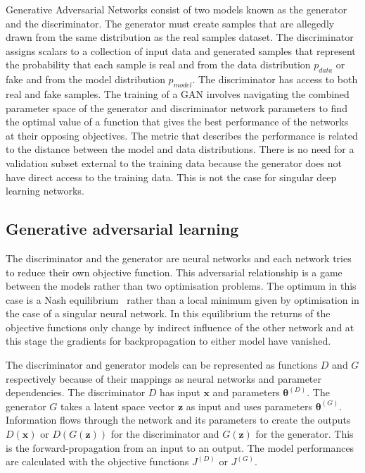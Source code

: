 \documentclass[twocolumn]{article}
\numberwithin{equation}{section}
\begin{document}
Generative Adversarial Networks consist of two models known as the generator and the discriminator. The generator must 
create samples that are allegedly drawn from the same distribution as the real samples dataset. The discriminator assigns 
scalars to a collection of input data and generated samples that represent the probability that each sample is real and 
from the data distribution $p_{data}$ or fake and from the model distribution  $p_{model}$. The discriminator has access 
to both real and fake samples. The training of a GAN involves navigating the combined parameter space of the generator 
and discriminator network parameters to find the optimal value of a function that gives the best performance of the 
networks at their opposing objectives. The metric that describes the performance is related to the distance between 
the model and data distributions. There is no need for a validation subset external to the training data because the 
generator does not have direct access to the training data. This is not the case for singular deep learning networks.

\subsection{Generative adversarial learning}
The discriminator and the generator are neural networks and each network tries to reduce their own objective function. 
This adversarial relationship is a game between the models rather than two optimisation problems. The optimum in this 
case is a Nash equilibrium~\cite{NIPS16} rather than a local minimum given by optimisation in the case of a singular 
neural network. In this equilibrium the returns of the objective functions only change by indirect influence of the 
other network and at this stage the gradients for backpropagation to either model have vanished.

The discriminator and generator models can be represented as functions $D$ and $G$ respectively because of their 
mappings as neural networks and parameter dependencies. The discriminator $D$ has input $\mathbf{x}$ and parameters 
$\bm{\theta}^{(D)}$. The generator $G$ takes a latent space vector $\mathbf{z}$ as input and uses parameters 
$\bm{\theta}^{(G)}$. Information flows through the network and its parameters to create the outputs $D(\mathbf{x})$ or 
$D(G(\mathbf{z}))$ for the discriminator and $G(\mathbf{z})$ for the generator. This is the forward-propagation from 
an input to an output. The model performances are calculated with the objective functions $J^{(D)}$ or $J^{(G)}$. 
\end{document}
